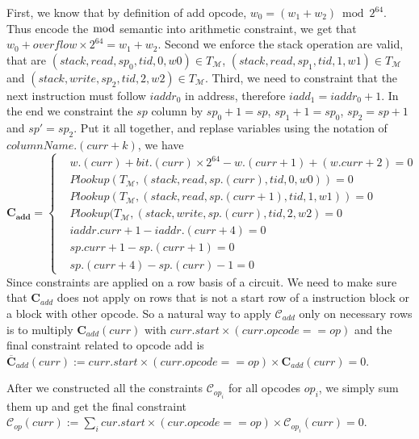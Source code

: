 First, we know that by definition of add opcode, $w_0 = (w_1+w_2) \bmod 2^{64}$. Thus encode the $\bmod$ semantic into arithmetic constraint, we get that $w_0 + overflow \times 2^{64}= w_1 + w_2$. Second we enforce the stack operation are valid, that are $(stack, read, sp_0, tid, 0, w0) \in T_\mathcal{M}$, $(stack, read, sp_1, tid, 1, w1) \in T_\mathcal{M}$ and $(stack, write, sp_2, tid, 2, w2) \in T_\mathcal{M}$. Third, we need to constraint that the next instruction must follow $iaddr_0$ in address, therefore $iadd_1 = iaddr_0 + 1$. In the end we constraint the $sp$ column by $sp_0 + 1= sp$, $sp_1 + 1= sp_0$, $sp_2 = sp+1$ and $sp' = sp_2$. Put it all together, and replase variables using the notation of $columnName.(curr + k)$, we have
\[
    \mathbf{C_{add}} = \begin{cases}
        &w.(curr) + bit.(curr) \times 2^{64} - w.(curr+1) + (w.curr + 2) = 0 \\
        &Plookup(T_\mathcal{M}, (stack, read, sp.(curr), tid, 0, w0)) = 0 \\
        &Plookup(T_\mathcal{M}, (stack, read, sp.(curr+1), tid, 1, w1)) = 0 \\
        &Plookup(T_\mathcal{M}, (stack, write, sp.(curr), tid, 2, w2) = 0 \\
        &iaddr.curr + 1 - iaddr.(curr + 4) = 0\\
        &sp.curr + 1 - sp.(curr+1) = 0\\
        &sp.(curr+4) - sp.(curr) - 1 = 0
    \end{cases}
\]
Since constraints are applied on a row basis of a circuit. We need to make sure that $\mathbf{C}_{add}$ does not apply on rows that is not a start row of a instruction block or a block with other opcode. So a natural way to apply $\mathcal{C}_{add}$ only on necessary rows is to multiply $\mathbf{C}_{add}(curr)$ with $curr.start \times (curr.opcode == op)$ and the final constraint related to opcode add is $\overline{\mathbf{C}}_{add}(curr) := curr.start \times (curr.opcode == op) \times \mathbf{C}_{add}(curr) = 0$.

After we constructed all the constraints $\mathcal{C}_{op_i}$ for all opcodes $op_i$, we simply sum them up and get the final constraint $\mathcal{C}_{op}(curr) := \sum_i cur.start \times (cur.opcode == op) \times \mathcal{C}_{op_i}(curr) = 0$.

